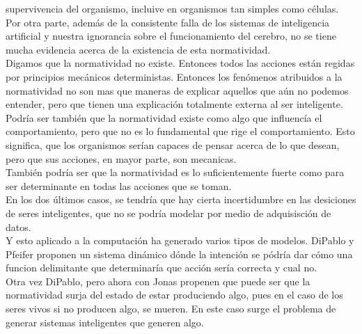 \documentclass[a4paper,12pt]{article}
\begin{document}
supervivencia del organismo, incluive en organismos tan simples como células. \\
Por otra parte, además de la consistente falla de los sistemas de inteligencia artificial y nuestra
ignorancia sobre el funcionamiento del cerebro, no se tiene mucha evidencia acerca de la existencia
 de esta normatividad.\\
Digamos que la normatividad no existe. Entonces todos las acciones están regidas por principios
mecánicos deterministas. Entonces los fenómenos atribuidos a la normatividad no son mas que maneras
de explicar aquellos que aún no podemos entender, pero que tienen una explicación totalmente externa
 al ser inteligente.
Podría ser también que la normatividad existe como algo que influencía el comportamiento, pero que
no es lo fundamental que rige el comportamiento. Esto significa, que los organismos serían capaces
de pensar acerca de lo que desean, pero que sus acciones, en mayor parte, son mecanicas.\\
También podría ser que la normatividad es lo suficientemente fuerte como para ser determinante en
todas las acciones que se toman.\\
En los dos últimos casos, se tendría que hay cierta incertidumbre en las desiciones de seres
inteligentes, que no se podría modelar por medio de adquisisción de datos.\\
Y esto aplicado a la computación ha generado varios tipos de modelos.
DiPablo y Pfeifer proponen un sistema dinámico dónde la intención se pódría dar cómo una funcion
delimitante que determinaría que acción sería correcta y cual no.\\
Otra vez DiPablo, pero ahora con Jonas propenen que puede ser que la normatividad surja del estado
de estar produciendo algo, pues en el caso de los seres vivos si no producen algo, se mueren. En
este caso surge el problema de generar sistemas inteligentes que generen algo.
\end{document}
